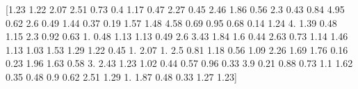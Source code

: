 \documentclass[preview]{standalone}
\begin{document}
\begin{center}
[1.23 1.22 2.07 2.51 0.73 0.4  1.17 0.47 2.27 0.45 2.46 1.86 0.56 2.3
 0.43 0.84 4.95 0.62 2.6  0.49 1.44 0.37 0.19 1.57 1.48 4.58 0.69 0.95
 0.68 0.14 1.24 4.   1.39 0.48 1.15 2.3  0.92 0.63 1.   0.48 1.13 1.13
 0.49 2.6  3.43 1.84 1.6  0.44 2.63 0.73 1.14 1.46 1.13 1.03 1.53 1.29
 1.22 0.45 1.   2.07 1.   2.5  0.81 1.18 0.56 1.09 2.26 1.69 1.76 0.16
 0.23 1.96 1.63 0.58 3.   2.43 1.23 1.02 0.44 0.57 0.96 0.33 3.9  0.21
 0.88 0.73 1.1  1.62 0.35 0.48 0.9  0.62 2.51 1.29 1.   1.87 0.48 0.33
 1.27 1.23]
\end{center}
\end{document}
